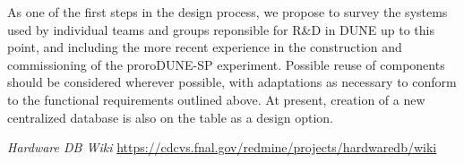 \documentclass[pdftex,12pt,letter]{article}
\begin{document}
\noindent As one of the first steps in the design process, we propose to survey the systems used by individual
teams and groups reponsible for R\&D in  DUNE up to this point, and including the more recent experience in
the construction and commissioning of the proroDUNE-SP experiment. Possible reuse of components should
be considered wherever possible, with adaptations as necessary to conform to the functional requirements
outlined above. At present, creation of a new centralized database is also on the table as a design option.











\begin{thebibliography}{1}

{\textit{Hardware DB Wiki} \url{https://cdcvs.fnal.gov/redmine/projects/hardwaredb/wiki}}

\end{thebibliography}
\end{document}
